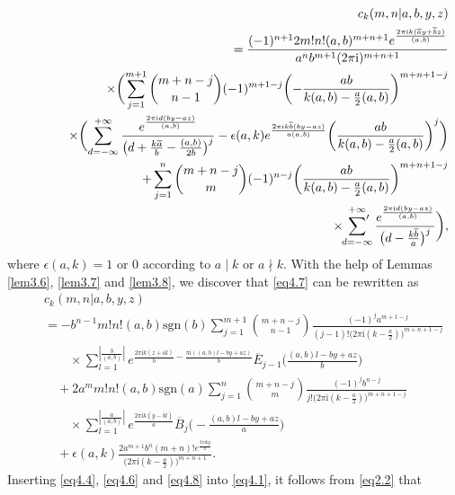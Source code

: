 \documentclass[reqno]{amsart}
\numberwithin{equation}{section}
\begin{document}
\begin{eqnarray}\label{eq4.7}
&&c_{k}(m,n|a,b,y,z)\nonumber\\
&&=\frac{(-1)^{n+1}2m!n!(a,b)^{m+n+1}e^{\frac{2\pi\mathrm{i}k(\overline{a}y+\overline{b}z)}{(a,b)}}}{a^{n}b^{m+1}(2\pi \mathrm{i})^{m+n+1}}\nonumber\\
&&\quad\times\biggl(\sum_{j=1}^{m+1}\binom{m+n-j}{n-1}(-1)^{m+1-j}\biggl(-\frac{ab}{k(a,b)-\frac{a}{2}(a,b)}\biggl)^{m+n+1-j}\nonumber\\
&&\qquad\quad\times\biggl(\sum_{d=-\infty}^{+\infty}
\frac{e^{\frac{2\pi\mathrm{i}d(by-az)}{(a,b)}}}{\bigl(d+\frac{k\overline{a}}{b}-\frac{(a,b)}{2b}\bigl)^{j}}-
\epsilon(a,k)e^{\frac{2\pi\mathrm{i}k\overline{b}(by-az)}{a(a,b)}}\biggl(\frac{ab}{k(a,b)-\frac{a}{2}(a,b)}\biggl)^{j}\biggl)\nonumber\\
&&\qquad+\sum_{j=1}^{n}\binom{m+n-j}{m}(-1)^{n-j}\biggl(\frac{ab}{k(a,b)-\frac{a}{2}(a,b)}\biggl)^{m+n+1-j}\nonumber\\
&&\qquad\quad\times\sideset{}{'}\sum_{d=-\infty}^{+\infty}\frac{e^{\frac{2\pi\mathrm{i}d(by-az)}{(a,b)}}}{\bigl(d-\frac{k\overline{b}}{a}\bigl)^{j}}\biggl),
\end{eqnarray}
where $\epsilon(a,k)=1$ or $0$ according to $a\mid k$ or $a\nmid k$. With the help of Lemmas \ref{lem3.6}, \ref{lem3.7} and \ref{lem3.8}, we discover that \eqref{eq4.7} can be rewritten as
\begin{eqnarray}\label{eq4.8}
&&c_{k}(m,n|a,b,y,z)\nonumber\\
&&=-b^{n-1}m!n!(a,b)\mathrm{sgn}(b)\sum_{j=1}^{m+1}\binom{m+n-j}{n-1}\frac{(-1)^{j}a^{m+1-j}}{(j-1)!\bigl(2\pi\mathrm{i}(k-\frac{a}{2})\bigl)^{m+n+1-j}}\nonumber\\
&&\qquad\times\sum_{l=1}^{|\frac{b}{(a,b)}|}e^{\frac{2\pi\mathrm{i}k(z+\overline{a}l)}{b}-\frac{\pi\mathrm{i}((a,b)l-by+az)}{b}}
\overline{E}_{j-1}\biggl(\frac{(a,b)l-by+az}{b}\biggl)\nonumber\\
&&\quad+2a^{m}m!n!(a,b)\mathrm{sgn}(a)\sum_{j=1}^{n}\binom{m+n-j}{m}\frac{(-1)^{j}b^{n-j}}{j!\bigl(2\pi\mathrm{i}(k-\frac{a}{2})\bigl)^{m+n+1-j}}\nonumber\\
&&\qquad\times\sum_{l=1}^{|\frac{a}{(a,b)}|}e^{\frac{2\pi\mathrm{i}k(y-\overline{b}l)}{a}}
\overline{B}_{j}\biggl(-\frac{(a,b)l-by+az}{a}\biggl)\nonumber\\
&&\quad+\epsilon(a,k)\frac{2a^{m+1}b^{n}(m+n)!e^{\frac{2\pi\mathrm{i}ky}{a}}}{\bigl(2\pi\mathrm{i}(k-\frac{a}{2})\bigl)^{m+n+1}}.
\end{eqnarray}
Inserting \eqref{eq4.4}, \eqref{eq4.6} and \eqref{eq4.8} into \eqref{eq4.1}, it follows from \eqref{eq2.2} that
\end{document}
